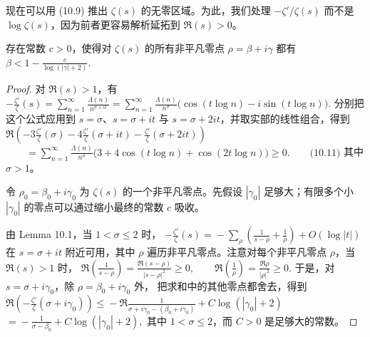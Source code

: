现在可以用 (10.9) 推出 $\zeta(s)$ 的无零区域。为此，我们处理
$-\zeta'/\zeta(s)$ 而不是 $\log\zeta(s)$，因为前者更容易解析延拓到
$\Re(s)>0$。

\begin{theorem}[原文 Theorem 10.5]
	存在常数 $c>0$，使得对 $\zeta(s)$ 的所有非平凡零点
	\(\textstyle \rho=\allowbreak{}\beta+\allowbreak{}i\gamma\)
	都有
	\(\textstyle \beta < 1-\frac{c}{\log(|\gamma|+\allowbreak{}2)}.\)
\end{theorem}

\begin{proof}
	对 $\Re(s)>1$，有
	\(\textstyle -\frac{\zeta'}{\zeta}(s) =\allowbreak{} \sum_{n=\allowbreak{}1}^{\infty}\frac{\Lambda(n)}{n^{\sigma+\allowbreak{}it}} =\allowbreak{} \sum_{n=\allowbreak{}1}^{\infty} \frac{\Lambda(n)}{n^\sigma} \bigl(\cos(t\log n)-i\sin(t\log n)\bigr).\)
	分别把这个公式应用到 $s=\sigma$、$s=\sigma+it$ 与
	$s=\sigma+2it$，并取实部的线性组合，得到
	\(\textstyle \Re\left( -3\frac{\zeta'}{\zeta}(\sigma) -4\frac{\zeta'}{\zeta}(\sigma+\allowbreak{}it) -\frac{\zeta'}{\zeta}(\sigma+\allowbreak{}2it) \right)\) \(\textstyle \qquad=\allowbreak{} \sum_{n=\allowbreak{}1}^{\infty} \frac{\Lambda(n)}{n^\sigma} \bigl(3+\allowbreak{}4\cos(t\log n)+\allowbreak{}\cos(2t\log n)\bigr) \geq\allowbreak{} 0. \qquad\text{(10.11)}\)
	其中 $\sigma>1$。

	令
	\(\textstyle \rho_0=\allowbreak{}\beta_0+\allowbreak{}i\gamma_0\)
	为 $\zeta(s)$ 的一个非平凡零点。先假设 $|\gamma_0|$ 足够大；有限多个小
	$|\gamma_0|$ 的零点可以通过缩小最终的常数 $c$ 吸收。

	由 Lemma 10.1，当 $1<\sigma\leq2$ 时，
	\(\textstyle -\frac{\zeta'}{\zeta}(s) =\allowbreak{} -\sum_\rho \left( \frac1{s-\rho} +\allowbreak{}\frac1{\rho} \right) +\allowbreak{} O(\log |t|)\)
	在 $s=\sigma+it$ 附近可用，其中 $\rho$ 遍历非平凡零点。注意对每个非平凡零点
	$\rho$，当 $\Re(s)>1$ 时，
	\(\textstyle \Re\left(\frac1{s-\rho}\right) =\allowbreak{} \frac{\Re(s-\rho)}{|s-\rho|^2} \geq\allowbreak{} 0,\allowbreak{} \qquad \Re\left(\frac1{\rho}\right) =\allowbreak{} \frac{\Re\rho}{|\rho|^2} \geq\allowbreak{} 0.\)
	于是，对 $s=\sigma+i\gamma_0$，除 $\rho=\beta_0+i\gamma_0$ 外，
	把求和中的其他零点都舍去，得到
	\(\textstyle \Re\left( -\frac{\zeta'}{\zeta}(\sigma+\allowbreak{}i\gamma_0) \right) \leq\allowbreak{} -\Re\frac{1}{\sigma+\allowbreak{}i\gamma_0-(\beta_0+\allowbreak{}i\gamma_0)} +\allowbreak{} C\log(|\gamma_0|+\allowbreak{}2)\) \(\textstyle =\allowbreak{} -\frac1{\sigma-\beta_0} +\allowbreak{} C\log(|\gamma_0|+\allowbreak{}2),\allowbreak{}\)
	其中 $1<\sigma\leq2$，而 $C>0$ 是足够大的常数。


\end{proof}
